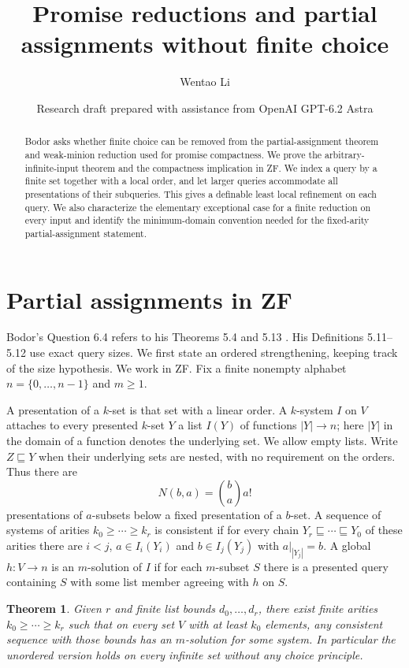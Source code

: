 \documentclass[11pt]{article}
\title{Promise reductions and partial assignments without finite choice}
\author{Wentao Li}
\date{\small Research draft prepared with assistance from OpenAI GPT-6.2 Astra}
\newtheorem{theorem}{Theorem}
\begin{document}
\maketitle
\begin{abstract}
Bodor asks whether finite choice can be removed from the partial-assignment theorem and weak-minion reduction used for promise compactness. We prove the arbitrary-infinite-input theorem and the compactness implication in ZF. We index a query by a finite set together with a local order, and let larger queries accommodate all presentations of their subqueries. This gives a definable least local refinement on each query. We also characterize the elementary exceptional case for a finite reduction on every input and identify the minimum-domain convention needed for the fixed-arity partial-assignment statement.
\end{abstract}

\section{Partial assignments in ZF}
Bodor's Question 6.4 refers to his Theorems 5.4 and 5.13 \cite{bodor}. His Definitions 5.11--5.12 use exact query sizes. We first state an ordered strengthening, keeping track of the size hypothesis. We work in ZF. Fix a finite nonempty alphabet $n=\{0,\ldots,n-1\}$ and $m\geq1$.

A presentation of a $k$-set is that set with a linear order. A $k$-system $I$ on $V$ attaches to every presented $k$-set $Y$ a list $I(Y)$ of functions $|Y|\to n$; here $|Y|$ in the domain of a function denotes the underlying set. We allow empty lists. Write $Z\sqsubseteq Y$ when their underlying sets are nested, with no requirement on the orders. Thus there are
\[
            N(b,a)=\binom ba a!
\]
presentations of $a$-subsets below a fixed presentation of a $b$-set. A sequence of systems of arities $k_0\geq\cdots\geq k_r$ is consistent if for every chain $Y_r\sqsubseteq\cdots\sqsubseteq Y_0$ of these arities there are $i<j$, $a\in I_i(Y_i)$ and $b\in I_j(Y_j)$ with $a|_{|Y_j|}=b$. A global $h:V\to n$ is an $m$-solution of $I$ if for each $m$-subset $S$ there is a presented query containing $S$ with some list member agreeing with $h$ on $S$.

\begin{theorem}\label{pas}
Given $r$ and finite list bounds $d_0,\ldots,d_r$, there exist finite arities $k_0\geq\cdots\geq k_r$ such that on every set $V$ with at least $k_0$ elements, any consistent sequence with those bounds has an $m$-solution for some system. In particular the unordered version holds on every infinite set without any choice principle.
\end{theorem}
\end{document}
